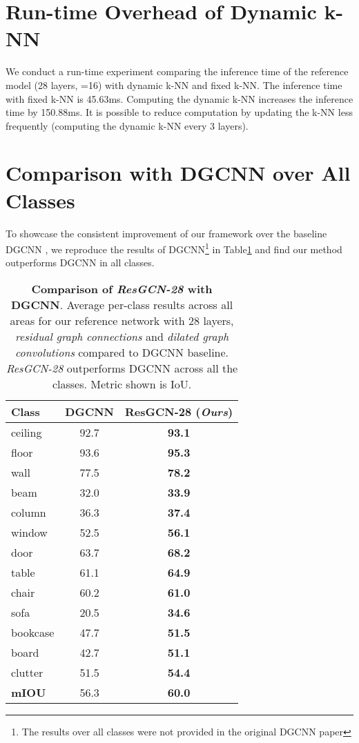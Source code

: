 \documentclass[10pt,twocolumn,letterpaper]{article}
\newcommand{\tblLabel}{Table\xspace}
\begin{document}
\section{Run-time Overhead of Dynamic k-NN} \label{appendix:runtime_overhead}
We conduct a run-time experiment comparing the inference time of the reference model (28 layers, =16) with dynamic k-NN and fixed k-NN. The inference time with fixed k-NN is 45.63ms. Computing the dynamic k-NN increases the inference time by 150.88ms. It is possible to reduce computation by updating the k-NN less frequently (\eg computing the dynamic k-NN every 3 layers).

\section{Comparison with DGCNN over All Classes} \label{appendix:dgcnn_all_classes}
To showcase the consistent improvement of our framework over the baseline DGCNN \cite{wang2018dynamic}, we reproduce the results of DGCNN\footnote{The results over all classes were not provided in the original DGCNN paper} in \tblLabel \ref{tbl:ours_vs_dgcnn} and find our method outperforms DGCNN in all classes.

\begin{table}[h]
\small
\centering
\setlength{\tabcolsep}{6pt} 
\begin{tabular}{l|cc}
\toprule
\textbf{Class}  & \textbf{DGCNN \cite{wang2018dynamic}} & \textbf{ResGCN-28 (\textit{Ours})} \\
\midrule
{ceiling} & 92.7 & \textbf{93.1} \\
{floor}   & 93.6 & \textbf{95.3} \\
{wall}    & 77.5 & \textbf{78.2} \\
{beam}    & 32.0 & \textbf{33.9} \\
{column}  & 36.3 & \textbf{37.4} \\
{window}  & 52.5 & \textbf{56.1} \\
{door}    & 63.7 & \textbf{68.2} \\
{table}   & 61.1 & \textbf{64.9} \\
{chair}   & 60.2 & \textbf{61.0} \\
{sofa}    & 20.5 & \textbf{34.6} \\
{bookcase}& 47.7 & \textbf{51.5} \\
{board}   & 42.7 & \textbf{51.1} \\
{clutter} & 51.5 & \textbf{54.4} \\
\midrule
\textbf{mIOU}    & 56.3 & \textbf{60.0} \\
\bottomrule
\end{tabular}
\vspace{2pt}
\caption{\textbf{Comparison of \emph{ResGCN-28} with DGCNN}. Average per-class results across all areas for our reference network with 28 layers, \emph{residual graph connections} and \emph{dilated graph convolutions} compared to DGCNN baseline. \emph{ResGCN-28} outperforms DGCNN across all the classes. Metric shown is IoU.}
\label{tbl:ours_vs_dgcnn}
\end{table}
\end{document}
